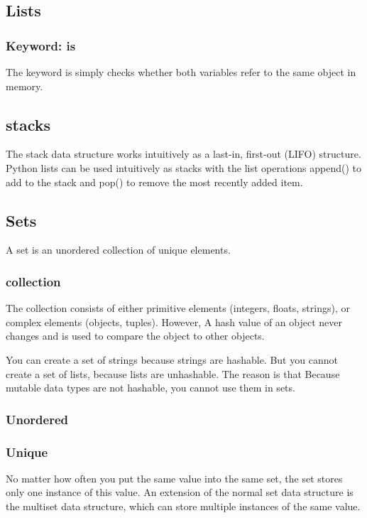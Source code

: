 \subsection{Lists}
\subsubsection*{Keyword: is}
The keyword \textsf{is} simply checks whether both variables refer to the same object in memory.
\subsection{stacks}
The stack data structure works intuitively as a last-in, first-out (LIFO)
structure. Python lists can be used intuitively as stacks with the list operations
append() to add to the stack and pop() to remove the most recently added item.
\subsection{Sets}
A set is an unordered collection of unique elements.
\subsubsection*{collection}
The collection consists
of either primitive elements (integers, floats, strings), or complex elements (objects, tuples). However,  A hash value of an object never changes and is used to compare the object to other objects.

You can create a set of strings because strings are hashable. But you cannot create a set of lists, because lists are unhashable. The reason is that  Because mutable data types are not hashable, you cannot use them in sets.
\subsubsection*{Unordered}
\subsubsection*{Unique}
No matter how often you put the same value into the same set, the set stores only one instance of this value. An extension of the normal set data structure is the multiset data structure, which can store multiple instances of the same value.

